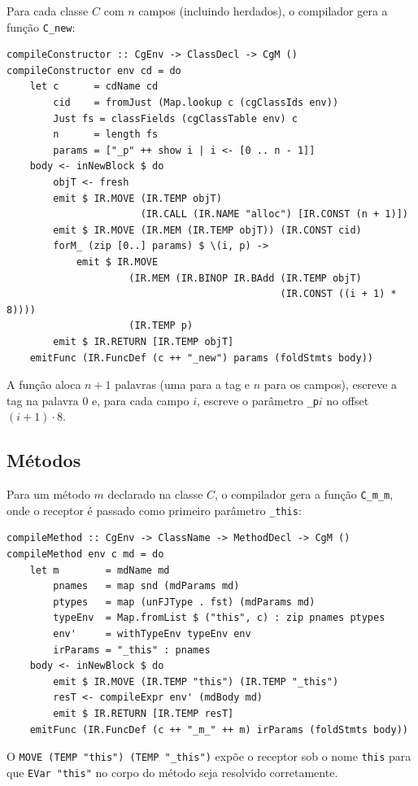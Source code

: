 Para cada classe \(C\) com \(n\) campos (incluindo herdados), o
compilador gera a função \texttt{C\_new}:

\begin{verbatim}
compileConstructor :: CgEnv -> ClassDecl -> CgM ()
compileConstructor env cd = do
    let c      = cdName cd
        cid    = fromJust (Map.lookup c (cgClassIds env))
        Just fs = classFields (cgClassTable env) c
        n      = length fs
        params = ["_p" ++ show i | i <- [0 .. n - 1]]
    body <- inNewBlock $ do
        objT <- fresh
        emit $ IR.MOVE (IR.TEMP objT)
                       (IR.CALL (IR.NAME "alloc") [IR.CONST (n + 1)])
        emit $ IR.MOVE (IR.MEM (IR.TEMP objT)) (IR.CONST cid)
        forM_ (zip [0..] params) $ \(i, p) ->
            emit $ IR.MOVE
                     (IR.MEM (IR.BINOP IR.BAdd (IR.TEMP objT)
                                               (IR.CONST ((i + 1) * 8))))
                     (IR.TEMP p)
        emit $ IR.RETURN [IR.TEMP objT]
    emitFunc (IR.FuncDef (c ++ "_new") params (foldStmts body))
\end{verbatim}

A função aloca \(n+1\) palavras (uma para a tag e \(n\) para os
campos), escreve a tag na palavra 0 e, para cada campo \(i\), escreve
o parâmetro \texttt{\_p}$i$ no offset \((i+1) \cdot 8\).

\subsection{Métodos}

Para um método \(m\) declarado na classe \(C\), o compilador gera a
função \texttt{C\_m\_m}, onde o receptor é passado como primeiro
parâmetro \texttt{\_this}:

\begin{verbatim}
compileMethod :: CgEnv -> ClassName -> MethodDecl -> CgM ()
compileMethod env c md = do
    let m        = mdName md
        pnames   = map snd (mdParams md)
        ptypes   = map (unFJType . fst) (mdParams md)
        typeEnv  = Map.fromList $ ("this", c) : zip pnames ptypes
        env'     = withTypeEnv typeEnv env
        irParams = "_this" : pnames
    body <- inNewBlock $ do
        emit $ IR.MOVE (IR.TEMP "this") (IR.TEMP "_this")
        resT <- compileExpr env' (mdBody md)
        emit $ IR.RETURN [IR.TEMP resT]
    emitFunc (IR.FuncDef (c ++ "_m_" ++ m) irParams (foldStmts body))
\end{verbatim}

O \texttt{MOVE (TEMP "this") (TEMP "\_this")} expõe o receptor sob o
nome \texttt{this} para que \texttt{EVar "this"} no corpo do método
seja resolvido corretamente.

